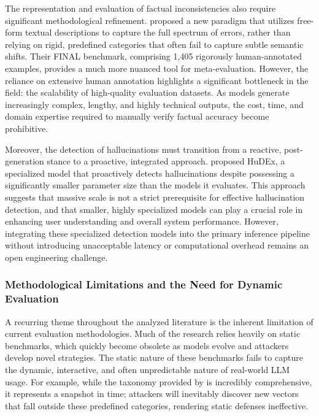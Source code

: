 \documentclass[11pt,a4paper]{article}
\begin{document}
The representation and evaluation of factual inconsistencies also require significant methodological refinement. \cite{Peisakhovsky_2025_LLMs} proposed a new paradigm that utilizes free-form textual descriptions to capture the full spectrum of errors, rather than relying on rigid, predefined categories that often fail to capture subtle semantic shifts. Their FINAL benchmark, comprising 1,405 rigorously human-annotated examples, provides a much more nuanced tool for meta-evaluation. However, the reliance on extensive human annotation highlights a significant bottleneck in the field: the scalability of high-quality evaluation datasets. As models generate increasingly complex, lengthy, and highly technical outputs, the cost, time, and domain expertise required to manually verify factual accuracy become prohibitive.

Moreover, the detection of hallucinations must transition from a reactive, post-generation stance to a proactive, integrated approach. \cite{Lee_2025_LLM} proposed HuDEx, a specialized model that proactively detects hallucinations despite possessing a significantly smaller parameter size than the models it evaluates. This approach suggests that massive scale is not a strict prerequisite for effective hallucination detection, and that smaller, highly specialized models can play a crucial role in enhancing user understanding and overall system performance. However, integrating these specialized detection models into the primary inference pipeline without introducing unacceptable latency or computational overhead remains an open engineering challenge.

\subsubsection{Methodological Limitations and the Need for Dynamic Evaluation}

A recurring theme throughout the analyzed literature is the inherent limitation of current evaluation methodologies. Much of the research relies heavily on static benchmarks, which quickly become obsolete as models evolve and attackers develop novel strategies. The static nature of these benchmarks fails to capture the dynamic, interactive, and often unpredictable nature of real-world LLM usage. For example, while the taxonomy provided by \cite{Pathade_2025_LLMs} is incredibly comprehensive, it represents a snapshot in time; attackers will inevitably discover new vectors that fall outside these predefined categories, rendering static defenses ineffective.
\end{document}
